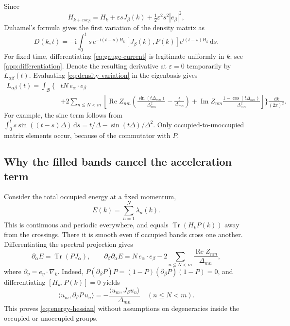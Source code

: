 \documentclass[11pt,a4paper]{article}
\newcommand{\BZ}{\mathcal B}
\newcommand{\dd}{\,\mathrm d}
\newcommand{\ii}{\mathrm i}
\DeclareMathOperator{\Tr}{Tr}
\DeclareMathOperator{\Rea}{Re}
\DeclareMathOperator{\Ima}{Im}
\theoremstyle{remark}
\numberwithin{equation}{section}
\begin{document}
Since
\[
 H_{k+\varepsilon s e_\beta}
 =H_k+\varepsilon sJ_\beta(k)
       +\tfrac12\varepsilon^2s^2|e_\beta|^2,
\]
Duhamel's formula gives the first variation of the density matrix as
\begin{equation}
 D(k,t)=-\ii\int_0^t s\,
 e^{-\ii(t-s)H_k}[J_\beta(k),P(k)]e^{\ii(t-s)H_k}\dd s.
 \label{eq:density-variation}
\end{equation}
For fixed time, differentiating \eqref{eq:gauge-current} is legitimate
uniformly in $k$; see \cref{app:differentiation}. Denote the resulting
derivative at $\varepsilon=0$ temporarily by $L_{\alpha\beta}(t)$.
Evaluating \eqref{eq:density-variation} in the eigenbasis gives
\begin{equation}
 \begin{split}
 L_{\alpha\beta}(t)
 =\int_\BZ\Biggl\{&tN\,e_\alpha\cdot e_\beta\\
 &+2\sum_{n\leq N<m}\left[
  \Rea Z_{nm}\left(\frac{\sin(t\Delta_{mn})}{\Delta_{mn}^2}
                         -\frac{t}{\Delta_{mn}}\right)
  +\Ima Z_{nm}\frac{1-\cos(t\Delta_{mn})}{\Delta_{mn}^2}
 \right]\Biggr\}\frac{\dd k}{(2\pi)^2}.
 \end{split}
 \label{eq:uncancelled-response}
\end{equation}
For example, the sine term follows from
$\int_0^t s\sin((t-s)\Delta)\dd s=t/\Delta-\sin(t\Delta)/\Delta^2$.
Only occupied-to-unoccupied matrix elements occur, because of the
commutator with $P$.

\subsection{Why the filled bands cancel the acceleration term}

Consider the total occupied energy at a fixed momentum,
\[
 E(k)=\sum_{n=1}^N\lambda_n(k).
\]
This is continuous and periodic everywhere, and equals $\Tr(H_kP(k))$
away from the crossings. There it is smooth even if occupied bands
cross one another. Differentiating the spectral projection gives
\begin{equation}
 \partial_\alpha E=\Tr(PJ_\alpha),\qquad
 \partial_\beta\partial_\alpha E
 =N\,e_\alpha\cdot e_\beta
       -2\sum_{n\leq N<m}\frac{\Rea Z_{nm}}{\Delta_{mn}},
 \label{eq:energy-hessian}
\end{equation}
where $\partial_\eta=e_\eta\cdot\nabla_k$.
Indeed, $P(\partial_\beta P)P=(1-P)(\partial_\beta P)(1-P)=0$,
and differentiating $[H_k,P(k)]=0$ yields
\[
 \langle u_m,\partial_\beta P\,u_n\rangle
 =-\frac{\langle u_m,J_\beta u_n\rangle}{\Delta_{mn}}
 \quad(n\leq N<m).
\]
This proves \eqref{eq:energy-hessian} without assumptions on degeneracies
inside the occupied or unoccupied groups.
\end{document}
